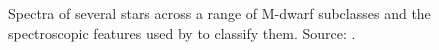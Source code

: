 \begin{figure}
	\captionsetup{width=.8\textwidth}
    \caption{Spectra of several stars across a range of M-dwarf subclasses and the spectroscopic features used by \citet{1991Kirkpatrick} to classify them. Source: \citet{2005Reid}.}
    \label{figMD_sub}
\end{figure}

